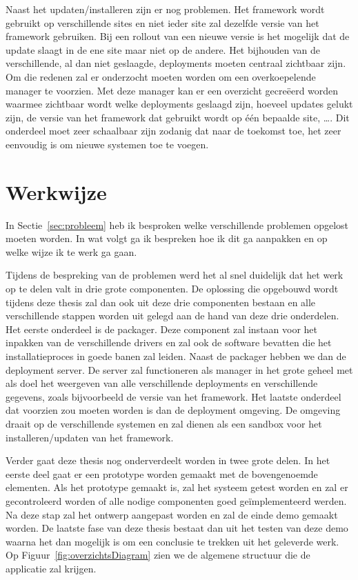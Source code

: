 Naast het updaten/installeren zijn er nog problemen.
Het framework wordt gebruikt op verschillende sites en niet ieder site zal dezelfde versie van het framework gebruiken.
Bij een rollout van een nieuwe versie is het mogelijk dat de update slaagt in de ene site maar niet op de andere.
Het bijhouden van de verschillende, al dan niet geslaagde, deployments moeten centraal zichtbaar zijn.
Om die redenen zal er onderzocht moeten worden om een overkoepelende manager te voorzien.
Met deze manager kan er een overzicht gecreëerd worden waarmee zichtbaar wordt welke deployments geslaagd zijn, hoeveel updates gelukt zijn, de versie van het framework dat gebruikt wordt op één bepaalde site, \ldots .
Dit onderdeel moet zeer schaalbaar zijn zodanig dat naar de toekomst toe, het zeer eenvoudig is om nieuwe systemen toe te voegen.

\section{Werkwijze}
In Sectie~\ref{sec:probleem} heb ik besproken welke verschillende problemen opgelost moeten worden.
In wat volgt ga ik bespreken hoe ik dit ga aanpakken en op welke wijze ik te werk ga gaan.

Tijdens de bespreking van de problemen werd het al snel duidelijk dat het werk op te delen valt in drie grote componenten.
De oplossing die opgebouwd wordt tijdens deze thesis zal dan ook uit deze drie componenten bestaan en alle verschillende stappen worden uit gelegd aan de hand van deze drie onderdelen.
Het eerste onderdeel is de packager.
Deze component zal instaan voor het inpakken van de verschillende drivers en zal ook de software bevatten die het installatieproces in goede banen zal leiden.
Naast de packager hebben we dan de deployment server.
De server zal functioneren als manager in het grote geheel met als doel het weergeven van alle verschillende deployments en verschillende gegevens, zoals bijvoorbeeld de versie van het framework.
Het laatste onderdeel dat voorzien zou moeten worden is dan de deployment omgeving.
De omgeving draait op de verschillende systemen en zal dienen als een sandbox voor het installeren/updaten van het framework.

Verder gaat deze thesis nog onderverdeelt worden in twee grote delen.
In het eerste deel gaat er een prototype worden gemaakt met de bovengenoemde elementen.
Als het prototype gemaakt is, zal het systeem getest worden en zal er gecontroleerd worden of alle nodige componenten goed geïmplementeerd werden.
Na deze stap zal het ontwerp aangepast worden en zal de einde demo gemaakt worden.
De laatste fase van deze thesis bestaat dan uit het testen van deze demo waarna het dan mogelijk is om een conclusie te trekken uit het geleverde werk. Op Figuur~\vref{fig:overzichtsDiagram} zien we de algemene structuur die de applicatie zal krijgen.

